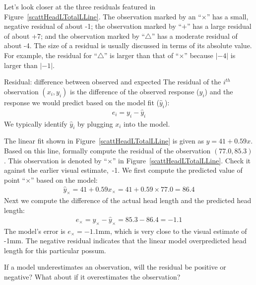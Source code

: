 Let's look closer at the three residuals featured in
Figure~\ref{scattHeadLTotalLLine}.
The observation marked by an ``$\times$'' has a small,
negative residual of about -1;
the observation marked by ``$+$'' has a large residual of about +7;
and the observation marked by ``$\triangle$'' has a moderate
residual of about -4.
The size of a residual is usually discussed in terms of its
absolute value.
For example, the residual for ``$\triangle$'' is larger than
that of ``$\times$'' because $|-4|$ is larger than $|-1|$.

\begin{onebox}{Residual: difference between observed and expected}
The residual of the $i^{th}$ observation $(x_i, y_i)$ is the difference of the observed response ($y_i$) and the response we would predict based on the model fit ($\hat{y}_i$):
\begin{eqnarray*}
e_i = y_i - \hat{y}_i
\end{eqnarray*}
We typically identify $\hat{y}_i$ by plugging $x_i$ into the model.
\end{onebox}

\begin{examplewrap}
\begin{nexample}{The linear fit shown in Figure~\ref{scattHeadLTotalLLine} is given as $\hat{y} = 41 + 0.59x$. Based on this line, formally compute the residual of the observation $(77.0, 85.3)$. This observation is denoted by ``$\times$'' in Figure~\ref{scattHeadLTotalLLine}.
Check it against the earlier visual estimate,~-1.}
We first compute the predicted value of point ``$\times$'' based on the model:
\begin{eqnarray*}
\hat{y}_{\times} = 41+0.59x_{\times} = 41+0.59\times 77.0 = 86.4
\end{eqnarray*}
Next we compute the difference of the actual head length and the predicted head length:
\begin{eqnarray*}
e_{\times} = y_{\times} - \hat{y}_{\times} = 85.3 -  86.4 = -1.1
\end{eqnarray*}
The model's error is $e_{\times} = -1.1$mm,
which is very close to the visual estimate of -1mm.
The negative residual indicates that the linear model
overpredicted head length for this particular possum.
\end{nexample}
\end{examplewrap}

\begin{exercisewrap}
\begin{nexercise}
If a model underestimates an observation, will the residual be positive or negative? What about if it overestimates the observation?\footnotemark
\end{nexercise}
\end{exercisewrap}

